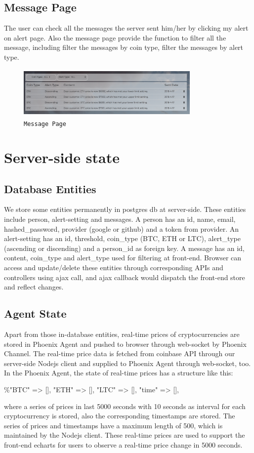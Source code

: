 \subsection{Message Page}
The user can check all the messages the server sent him/her by clicking my alert on alert
page. Also the message page provide the function to filter all the message, including filter
the messages by coin type, filter the messages by alert type.

\begin{figure}[!htb]
\includegraphics[height=1.0in, width=3.5in]{message.png}
\caption{\texttt{Message Page}}
\end{figure}





\section{Server-side state}
\subsection{Database Entities}
We store some entities permanently in postgres db at server-side. 
These entities include person, alert-setting and messages. 
A person has an id, name, email, hashed\_password, provider 
(google or github) and a token from provider. An alert-setting 
has an id, threshold, coin\_type (BTC, ETH or LTC), alert\_type 
(ascending or discending) and a person\_id as foreign key. 
A message has an id, content, coin\_type and alert\_type used 
for filtering at front-end. Browser can access and update/delete 
these entities through corresponding APIs and controllers using 
ajax call, and ajax callback would dispatch the front-end store 
and reflect changes.
\subsection{Agent State}
Apart from those in-database entities, real-time prices of 
cryptocurrencies are stored in Phoenix Agent and pushed to 
browser through web-socket by Phoenix Channel. The real-time 
price data is fetched from coinbase API through our server-side 
Nodejs client and supplied to Phoenix Agent through web-socket, 
too. In the Phoenix Agent, the state of real-time prices has 
a structure like this: 
\begin{center} 
\%{"BTC" => [], "ETH" => [], "LTC" => [], "time" => []}, 
\end{center}
where a series of prices in last 5000 seconds 
with 10 seconds as interval for each cryptocurrency is stored, 
also the corresponding timestamps are stored. The series of prices 
and timestamps have a maximum length of 500, which is maintained 
by the Nodejs client. These real-time prices are used to support 
the front-end echarts for users to observe a real-time price 
change in 5000 seconds. 
